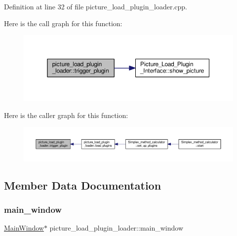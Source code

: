 Definition at line 32 of file picture\+\_\+load\+\_\+plugin\+\_\+loader.\+cpp.

Here is the call graph for this function\+:\nopagebreak
\begin{figure}[H]
\begin{center}
\leavevmode
\includegraphics[width=350pt]{classpicture__load__plugin__loader_a7e8827db78dabf7872b30305e1f29af0_cgraph}
\end{center}
\end{figure}
Here is the caller graph for this function\+:\nopagebreak
\begin{figure}[H]
\begin{center}
\leavevmode
\includegraphics[width=350pt]{classpicture__load__plugin__loader_a7e8827db78dabf7872b30305e1f29af0_icgraph}
\end{center}
\end{figure}


\subsection{Member Data Documentation}
\mbox{\label{classpicture__load__plugin__loader_a6a6c98c4ff9b1506b82a6a87e2b2103b}} 
\subsubsection{\texorpdfstring{main\+\_\+window}{main\_window}}
{\footnotesize\ttfamily \hyperlink{classMainWindow}{Main\+Window}$\ast$ picture\+\_\+load\+\_\+plugin\+\_\+loader\+::main\+\_\+window\hspace{0.3cm}{\ttfamily [private]}}



